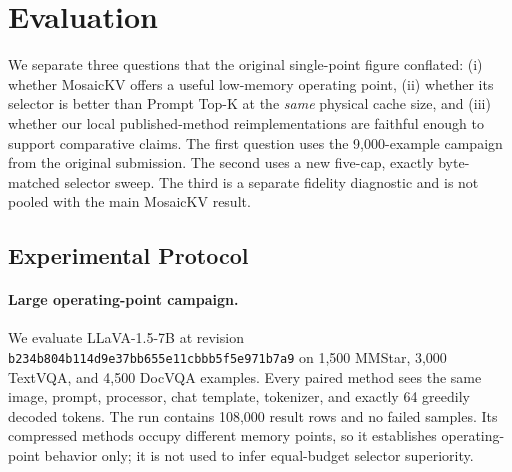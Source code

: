 %
%

\section{Evaluation}
\label{sec:evaluation}

We separate three questions that the original single-point figure conflated:
(i) whether MosaicKV offers a useful low-memory operating point, (ii) whether
its selector is better than Prompt Top-K at the \emph{same} physical cache
size, and (iii) whether our local published-method reimplementations are
faithful enough to support comparative claims.  The first question uses the
9,000-example campaign from the original submission.  The second uses a new
five-cap, exactly byte-matched selector sweep.  The third is a separate
fidelity diagnostic and is not pooled with the main MosaicKV result.

\subsection{Experimental Protocol}
\label{sec:eval-protocol}

\paragraph{Large operating-point campaign.}
We evaluate LLaVA-1.5-7B at revision
\texttt{b234b804b114d9e37bb655e11cbbb5f5e971b7a9} on 1,500 MMStar,
3,000 TextVQA, and 4,500 DocVQA examples.  Every paired method sees the same
image, prompt, processor, chat template, tokenizer, and exactly 64 greedily
decoded tokens.  The run contains 108,000 result rows and no failed samples.
Its compressed methods occupy different memory points, so it establishes
operating-point behavior only; it is not used to infer equal-budget selector
superiority.

